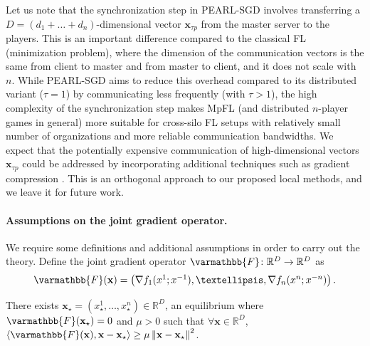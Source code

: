 \documentclass{article}
\newcommand{\algname}[1]{{\color{PineGreen}\sf  #1}\xspace}
\newcommand{\vx}{{\mathbf{x}}}
\newcommand{\reals}{\mathbb{R}}
\newcommand{\opF}{{\varmathbb{F}}}
\newcommand{\inprod}[2]{\left\langle #1,#2 \right\rangle}
\newcommand{\sqnorm}[1]{\left\| #1 \right\|^2}
\newcommand{\abbvname}{\algname{PEARL-SGD}}
\theoremstyle{plain}
\theoremstyle{remark}
\begin{document}
Let us note that the synchronization step in \abbvname involves transferring a $D=(d_1+\dots+d_n)$-dimensional vector $\vx_{\tau p}$ from the master server to the players. This is an important difference compared to the classical FL (minimization problem), where the dimension of the communication vectors is the same from client to master and from master to client, and it does not scale with $n$. 
While \abbvname aims to reduce this overhead compared to its distributed variant ($\tau=1$) by communicating less frequently (with $\tau > 1$), the high complexity of the synchronization step makes MpFL (and distributed $n$-player games in general) more suitable for cross-silo FL setups with relatively small number of organizations and more reliable communication bandwidths.
We expect that the potentially expensive communication of high-dimensional vectors $\vx_{\tau p}$ could be addressed by incorporating additional techniques such as gradient compression \citep{alistarh2017qsgd, BeznosikovGorbunovBerardLoizou2023_stochastic}. 
This is an orthogonal approach to our proposed local methods, and we leave it for future work.

\paragraph{Assumptions on the joint gradient operator.}
We require some definitions and additional assumptions in order to carry out the theory.
Define the joint gradient operator $\opF\colon \reals^D \to \reals^D$ as
\begin{equation*}
\textstyle
    \opF(\vx) = \left( \nabla f_1 (x^1; x^{-1}), \dots, \nabla f_n (x^n; x^{-n}) \right) .
\end{equation*}

\begin{assumption}
\label{assumption:quasi-strong-monotonicity}
There exists $\vx_\star = (x_\star^1, \dots, x_\star^n) \in \reals^D$, an equilibrium where $\opF(\vx_\star) = 0$ and $\mu > 0$ such that $\forall \vx \in \reals^D$, $\inprod{\opF(\vx)}{\vx - \vx_\star} \ge \mu \sqnorm{\vx - \vx_\star}$.
\end{assumption}
\end{document}

